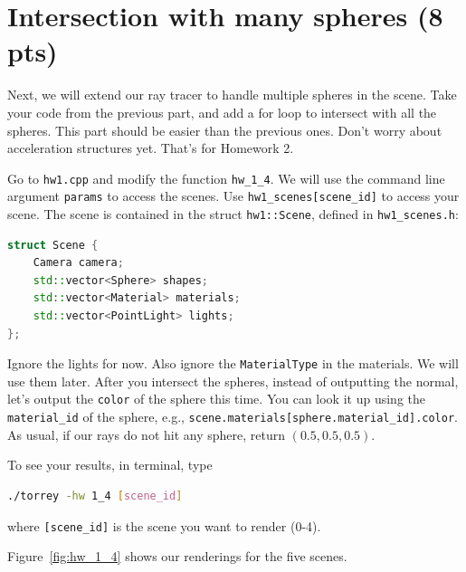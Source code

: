 \section{Intersection with many spheres (8 pts)}
Next, we will extend our ray tracer to handle multiple spheres in the scene. Take your code from the previous part, and add a for loop to intersect with all the spheres. This part should be easier than the previous ones. Don't worry about acceleration structures yet. That's for Homework 2.

Go to \lstinline{hw1.cpp} and modify the function \lstinline{hw_1_4}. We will use the command line argument \lstinline{params} to access the scenes. Use \lstinline{hw1_scenes[scene_id]} to access your scene. The scene is contained in the struct \lstinline{hw1::Scene}, defined in \lstinline{hw1_scenes.h}:
\begin{lstlisting}[language=C++]
struct Scene {
    Camera camera;
    std::vector<Sphere> shapes;
    std::vector<Material> materials;
    std::vector<PointLight> lights; 
};
\end{lstlisting}
Ignore the lights for now. Also ignore the \lstinline{MaterialType} in the materials. We will use them later.
After you intersect the spheres, instead of outputting the normal, let's output the \lstinline{color} of the sphere this time. You can look it up using the \lstinline{material_id} of the sphere, e.g., \lstinline{scene.materials[sphere.material_id].color}. As usual, if our rays do not hit any sphere, return $(0.5, 0.5, 0.5)$.

To see your results, in terminal, type
\begin{lstlisting}[language=bash]
  ./torrey -hw 1_4 [scene_id]
\end{lstlisting}
where \lstinline{[scene_id]} is the scene you want to render (0-4).

Figure~\ref{fig:hw_1_4} shows our renderings for the five scenes.

